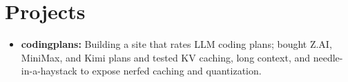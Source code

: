 \documentclass[11pt, letterpaper]{article}
\begin{document}
\section{Projects}
\begin{itemize}
  \item \textbf{codingplans:} Building a site that rates LLM coding plans; bought Z.AI, MiniMax, and Kimi plans and tested KV caching, long context, and needle-in-a-haystack to expose nerfed caching and quantization.
\end{itemize}
\end{document}
